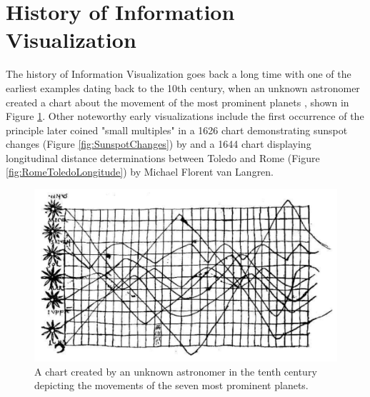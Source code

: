 \section{History of Information Visualization}

The history of Information Visualization goes back a long time with one of the earliest examples dating back to the 10th century, when an unknown astronomer created a chart about the movement of the most prominent planets \parencite{CommentariiInSomniumScipionis}, shown in Figure \ref{fig:PlanetaryMovements}.
Other noteworthy early visualizations include the first occurrence of the principle \cite{VisualDisplayOfQuantitativeInformation} later coined "small multiples" in a 1626 chart demonstrating sunspot changes (Figure \ref{fig:SunspotChanges}) by \cite{RosaUrsina} and a 1644 chart displaying longitudinal distance determinations between Toledo and Rome (Figure \ref{fig:RomeToledoLongitude}) by Michael Florent van Langren.

\begin{figure}[tp]
\centering
\includegraphics[keepaspectratio,width=\linewidth,height=\fullh / 3]{images/planetary-movements.png}
\caption[Chart of Planetary Movements from the Tenth Century]{
  A chart created by an unknown astronomer in the tenth century depicting the movements of the seven most prominent planets.
}
\label{fig:PlanetaryMovements}
\end{figure}

